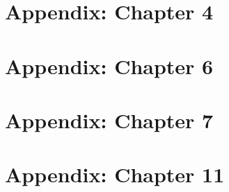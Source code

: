 \documentclass[ titlepage,numbers=noenddot,headinclude,
                footinclude=true,cleardoublepage=empty,abstractoff,
                BCOR=5mm,paper=letter,fontsize=12pt,
                american,
                openany
                ]{scrreprt}
\begin{document}
\chapter{Appendix: Chapter 4}\label{app:skewfit}


\chapter{Appendix: Chapter 6}\label{app:awac}


\chapter{Appendix: Chapter 7}\label{app:iql}


\chapter{Appendix: Chapter 11}\label{app:val}

\end{document}
